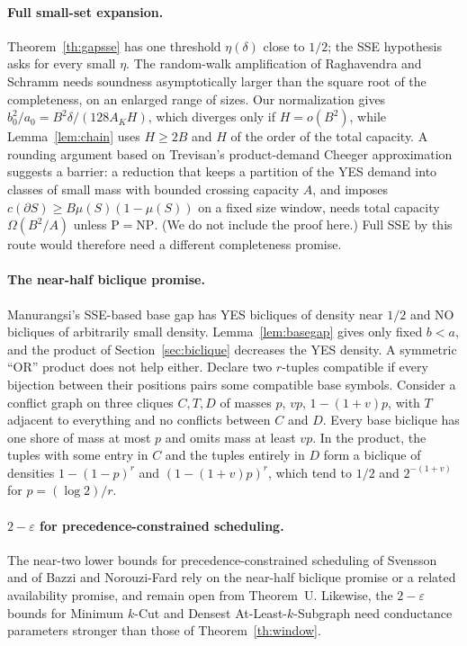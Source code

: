 \documentclass[11pt,letterpaper]{article}
\theoremstyle{definition}
\theoremstyle{remark}
\newcommand{\eps}{\varepsilon}
\begin{document}
\paragraph{Full small-set expansion.}
Theorem~\ref{th:gapsse} has one threshold \(\eta(\delta)\) close to \(1/2\);
the SSE hypothesis \cite{rs10} asks for every small \(\eta\). The
random-walk amplification of Raghavendra and Schramm \cite{rsch14} needs
soundness asymptotically larger than the square root of the completeness,
on an enlarged range of sizes. Our normalization gives
\(b_0^2/a_0=B^2\delta/(128A_KH)\), which diverges only if \(H=o(B^2)\), while
Lemma~\ref{lem:chain} uses \(H\ge2B\) and \(H\) of the order of the total
capacity. A rounding argument based on Trevisan's product-demand Cheeger
approximation \cite{tre13} suggests a barrier: a reduction that keeps a
partition of the YES demand into classes of small mass with bounded crossing
capacity \(A\), and imposes \(c(\partial S)\ge B\mu(S)(1-\mu(S))\) on a fixed
size window, needs total capacity \(\Omega(B^2/A)\) unless
\(\mathrm P=\mathrm{NP}\). (We do not include the proof here.) Full SSE by
this route would therefore need a different completeness promise.

\paragraph{The near-half biclique promise.}
Manurangsi's SSE-based base gap \cite{man18} has YES bicliques of density near
\(1/2\) and NO bicliques of arbitrarily small density. Lemma~\ref{lem:basegap}
gives only fixed \(b<a\), and the product of Section~\ref{sec:biclique}
decreases the YES density. A symmetric ``OR'' product does not help either.
Declare two \(r\)-tuples compatible if every bijection between their
positions pairs some compatible base symbols. Consider a conflict graph on
three cliques \(C,T,D\) of masses \(p\), \(vp\), \(1-(1+v)p\), with \(T\)
adjacent to everything and no conflicts between \(C\) and \(D\). Every base
biclique has one shore of mass at most \(p\) and omits mass at least \(vp\).
In the product, the tuples with some entry in \(C\) and the tuples entirely
in \(D\) form a biclique of densities \(1-(1-p)^r\) and \((1-(1+v)p)^r\),
which tend to \(1/2\) and \(2^{-(1+v)}\) for \(p=(\log2)/r\).

\paragraph{\(2-\eps\) for precedence-constrained scheduling.}
The near-two lower bounds for precedence-constrained scheduling of Svensson
\cite{sve11} and of Bazzi and Norouzi-Fard \cite{bnf15} rely on the near-half
biclique promise or a related availability promise, and remain open from
Theorem~U. Likewise, the \(2-\eps\) bounds for Minimum \(k\)-Cut and Densest
At-Least-\(k\)-Subgraph \cite{man18} need conductance parameters stronger
than those of Theorem~\ref{th:window}.
\end{document}
